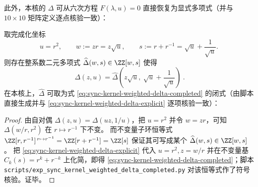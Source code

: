 此外，本核的 \(\Delta\) 可从六次方程 \(F(\lambda,u)=0\) 直接恢复为显式多项式（并与 \(10\times 10\) 矩阵定义逐点核验一致）：

\begin{proposition}[完成化行列式的二元闭式：\texorpdfstring{$\Delta(z,u)=\widehat\Delta(w,s)$}{Delta=hatDelta}]\label{prop:sync-kernel-weighted-hat-delta}
取完成化坐标
\[
u=r^2,\qquad w:=zr=z\sqrt{u},\qquad s:=r+r^{-1}=\sqrt{u}+\frac{1}{\sqrt{u}}.
\]
则存在整系数二元多项式 \(\widehat\Delta(w,s)\in\ZZ[w,s]\) 使得
\[
\boxed{\ \Delta(z,u)=\widehat\Delta\!\left(z\sqrt{u},\ \sqrt{u}+\frac{1}{\sqrt{u}}\right)\ }.
\]
在本核上，\(\widehat\Delta\) 可取为式 \eqref{eq:sync-kernel-weighted-delta-completed} 的闭式（由脚本直接生成并与 \eqref{eq:sync-kernel-weighted-delta-explicit} 逐项核验一致）：

\end{proposition}
\begin{proof}
由自对偶 \(\Delta(z,u)=\Delta(uz,1/u)\)，把 \(u=r^2\) 并令 \(w=zr\)，可知
\(
\Delta(w/r,r^2)
\)
在 \(r\mapsto r^{-1}\) 下不变。
而不变量子环恒等式
\(
\ZZ[r,r^{-1}]^{\,r\mapsto r^{-1}}=\ZZ[r+r^{-1}]=\ZZ[s]
\)
保证其可写成某个 \(\widehat\Delta(w,s)\in\ZZ[w,s]\)。
把 \eqref{eq:sync-kernel-weighted-delta-explicit} 代入 \(u=r^2,z=w/r\) 并在不变量基 \(C_k(s)=r^k+r^{-k}\) 上化简，即得 \eqref{eq:sync-kernel-weighted-delta-completed}；脚本 \texttt{scripts/exp\_sync\_kernel\_weighted\_delta\_completed.py} 对该恒等式作了符号核验。证毕。
\end{proof}
